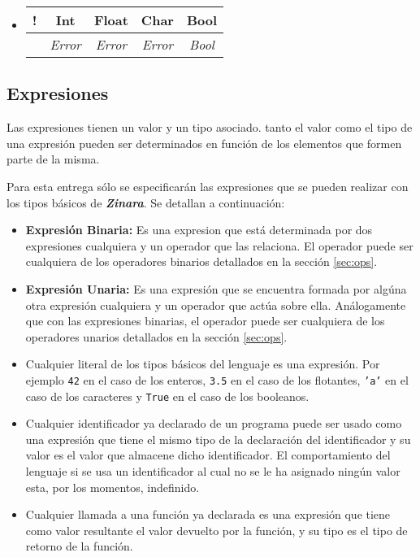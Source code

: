\documentclass[12pt, spanish]{report}
\begin{document}
\begin{itemize}
\item
\begin{tabular}{|c||cccc|}
 \hline
!       &  Int  & Float & Char  & Bool  \\ 
 \hline \hline
        & \emph{Error} & \emph{Error} & \emph{Error} & \emph{Bool} \\
	\hline
\end{tabular}
\end{itemize}

\subsection{Expresiones}
\label{sec:expr}

Las expresiones tienen un valor y un tipo asociado. tanto el valor
como el tipo de una expresión pueden ser determinados en función de
los elementos que formen parte de la misma.

Para esta entrega sólo se especificarán las expresiones que se pueden
realizar con los tipos básicos de \emph{\textbf{Zinara}}. Se detallan
a continuación:

\begin{itemize}
\item \textbf{Expresión Binaria:} Es una expresion que está
      determinada por dos expresiones cualquiera y un operador que las
      relaciona. El operador puede ser cualquiera de los operadores
      binarios detallados en la sección \ref{sec:ops}.
      
 \item \textbf{Expresión Unaria:} Es una expresión que se encuentra
       formada por algúna otra expresión cualquiera y un operador que actúa
       sobre ella. Análogamente que con las expresiones binarias, el
       operador puede ser cualquiera de los operadores unarios detallados
       en la sección \ref{sec:ops}.
       
 \item Cualquier literal de los tipos básicos del lenguaje es una
       expresión. Por ejemplo \texttt{42} en el caso de los enteros,
       \texttt{3.5} en el caso de los flotantes, \texttt{'a'} en el caso de
       los caracteres y \texttt{True} en el caso de los booleanos.
       
 \item Cualquier identificador ya declarado de un programa puede ser
       usado como una expresión que tiene el mismo tipo de la declaración
       del identificador y su valor es el valor que almacene dicho
       identificador. El comportamiento del lenguaje si se usa un
       identificador al cual no se le ha asignado ning\'un valor esta,
       por los momentos, indefinido.
       
 \item Cualquier llamada a una función ya declarada es una expresión
       que tiene como valor resultante el valor devuelto por la función, y
       su tipo es el tipo de retorno de la función.
\end{itemize}
\end{document}
